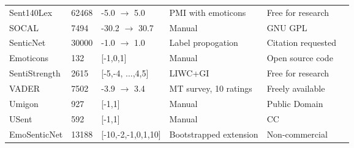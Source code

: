 {\begin{tabular*}{\linewidth}{ l | l | l | l | l | l}
    Sent140Lex & 62468 & -5.0 $\to$ 5.0 & PMI with emoticons & Free for research & \cite{MohammadKZ2013}\\
    SOCAL & 7494 & -30.2 $\to$ 30.7 & Manual & GNU GPL & \cite{taboada2011lexicon}\\
    SenticNet & 30000 & -1.0 $\to$ 1.0 & Label propogation & Citation requested & \cite{cambria2014senticnet}\\
    Emoticons & 132 & [-1,0,1] & Manual & Open source code & \cite{gonccalves2013comparing}\\
    SentiStrength & 2615 & [-5,-4, $\ldots$,4,5] & LIWC+GI & Free for research & \cite{thelwall2010sentiment}\\
    VADER & 7502 & -3.9 $\to$ 3.4 & MT survey, 10 ratings & Freely available & \cite{hutto2014vader}\\
    Umigon & 927 & [-1,1] & Manual & Public Domain & \cite{levallois2013umigon}\\
    USent & 592 & [-1,1] & Manual & CC & \cite{pappas2013distinguishing}\\
    EmoSenticNet & 13188 & [-10,-2,-1,0,1,10] & Bootstrapped extension & Non-commercial & \cite{poria2013enhanced}\\
\end{tabular*}}